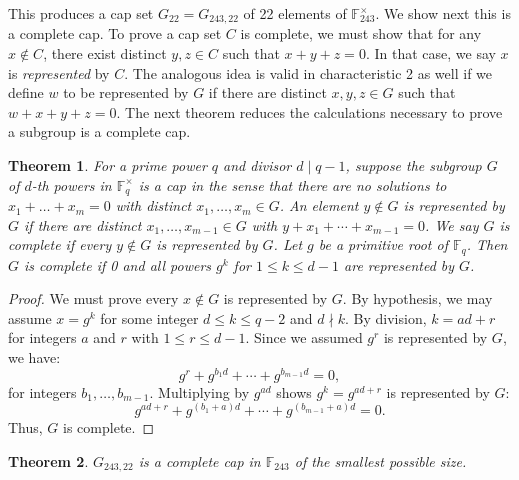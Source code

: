 \documentclass[12pt]{amsart}
\newtheorem{thm}{Theorem}
\theoremstyle{definition}
\begin{document}
This produces a cap set $G_{22}=G_{243,22}$ of 22 elements of 
$\mathbb{F}_{243}^\times$. We show next this is a complete cap.
To prove a cap set $C$ is complete, we must show that for any $x\notin
C$, there exist distinct $y,z\in C$ such that $x+y+z=0$. In that case,
we say $x$ is \emph{represented} by $C$.
The analogous idea is valid in characteristic 2 as well if we define
$w$ to be represented by $G$ if there are distinct $x,y,z\in G$ such
that $w+x+y+z=0$.
The next theorem reduces the
calculations necessary to prove a subgroup is a complete cap.

\begin{thm}
  For a prime power $q$ and divisor $d\mid q-1$, suppose the subgroup
  $G$ of $d$-th powers in $\mathbb{F}_q^\times$ is a cap in the sense
  that there are no solutions to $x_1+\dots+x_m=0$ with distinct
  $x_1,\dots,x_m\in G$. An element $y\notin G$ is represented by
  $G$ if there are distinct $x_1,\dots,x_{m-1}\in G$ with
  $y+x_1+\dotsb+x_{m-1}=0$. We say $G$ is complete if every
  $y\notin G$ is represented by $G$.  Let $g$ be a primitive root of
  $\mathbb{F}_q$.  Then $G$ is complete if 0 and all powers $g^k$ for
  $1\le k\le d-1$ are represented by $G$.
\end{thm}

\begin{proof}
  We must prove every $x\notin G$ is represented by $G$. By
  hypothesis, we may assume $x=g^k$ for some integer $d\le k\le q-2$
  and $d\nmid k$. By division, $k=ad+r$ for integers $a$ and $r$ with
  $1\le r\le d-1$. Since we assumed $g^r$ is represented by $G$, we
  have:
  $$
  g^{r} + g^{b_1d}+\dotsb+g^{b_{m-1}d}=0,
  $$
  for integers $b_1,\dots,b_{m-1}$. Multiplying by $g^{ad}$ shows
  $g^k=g^{ad+r}$ is represented by $G$:
  $$
  g^{ad+r} + g^{(b_1+a)d}+\dotsb+g^{(b_{m-1}+a)d}=0.
  $$
  Thus,   $G$ is complete. 
\end{proof}

\begin{thm}
  $G_{243,22}$ is a complete cap in $\mathbb{F}_{243}$ of the smallest
  possible size.
\end{thm}
\end{document}

